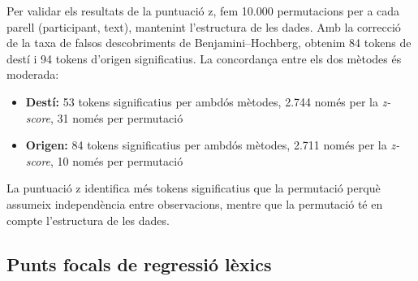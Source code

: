 Per validar els resultats de la puntuació z, fem 10.000 permutacions per a cada parell (participant, text), mantenint l'estructura de les dades.
Amb la correcció de la taxa de falsos descobriments de Benjamini--Hochberg, obtenim 84 tokens de destí i 94 tokens d'origen significatius.
La concordança entre els dos mètodes és moderada:

\begin{itemize}
    \item \textbf{Destí:} 53 tokens significatius per ambdós mètodes, 2.744 només per la \textit{z-score}, 31 només per permutació
    \item \textbf{Origen:} 84 tokens significatius per ambdós mètodes, 2.711 només per la \textit{z-score}, 10 només per permutació
\end{itemize}

La puntuació z identifica més tokens significatius que la permutació perquè assumeix independència entre observacions, mentre que la permutació té en compte l'estructura de les dades.

\subsection{Punts focals de regressió lèxics}

